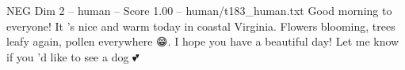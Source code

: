 \begin{textsample}{NEG Dim 2 – human – Score 1.00 – human/t183\_human.txt}  \label{ex:f2_neg_023}
Good morning to everyone!
It ’s nice and warm today in coastal Virginia.
Flowers blooming, trees leafy again, pollen everywhere {\EmojiFont 😁}.
I hope you have a beautiful day!
Let me know if you ’d like to see a dog {\EmojiFont 💕}

\end{textsample}
